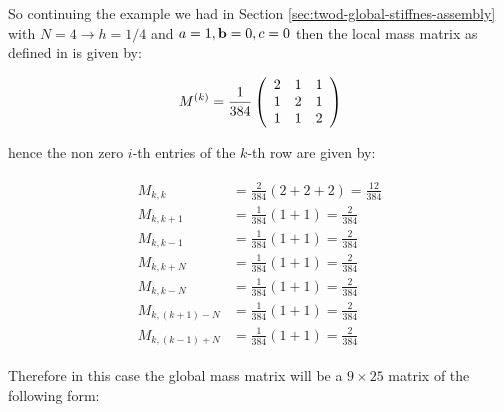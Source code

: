 So continuing the example we had in Section
\ref{sec:twod-global-stiffnes-assembly} with $N = 4 \rightarrow h = 1/4$ and
$a = 1, \mathbf{b} = 0, c = 0$ then the local mass matrix as defined in
 is given by:

\begin{equation}\label{eq:twod-local-mass}
    M^{(k)} =
    \frac{1}{384}\left(\begin{array}{c c c}
         2 &  1 &  1 \\
         1 &  2 &  1 \\
         1 &  1 &  2
      \end{array}\right)
\end{equation}

hence the non zero $i$-th entries of the $k$-th row are given by:

\begin{align}
  \begin{split}
    M_{k,k} &= \frac{2}{384}(2 + 2 + 2) = \frac{12}{384}\\
    M_{k,k+1} &= \frac{1}{384}(1 + 1) = \frac{2}{384} \\
    M_{k,k-1} &= \frac{1}{384}(1 + 1) = \frac{2}{384} \\
    M_{k,k+N} &= \frac{1}{384}(1 + 1) = \frac{2}{384} \\
    M_{k,k-N} &= \frac{1}{384}(1 + 1) = \frac{2}{384} \\
    M_{k,(k+1)-N} &= \frac{1}{384}(1 + 1) = \frac{2}{384} \\
    M_{k,(k-1)+N} &= \frac{1}{384}(1 + 1) = \frac{2}{384}
  \end{split}
\end{align}

Therefore in this case the global mass matrix will be a $9 \times 25$ matrix of
the following form:

